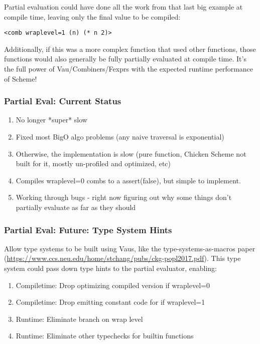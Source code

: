 \documentclass{beamer}
\begin{document}
\begin{frame}[fragile]
Partial evaluation could have done all the work from that last big example at compile time, leaving only the final value to be compiled:
\footnotesize
\begin{verbatim}
<comb wraplevel=1 (n) (* n 2)>
\end{verbatim}
	Additionally, if this was a more complex function that used other functions, those functions would also generally be fully partially evaluated at compile time.
	It's the full power of Vau/Combiners/Fexprs with the expected runtime performance of Scheme!
\end{frame}

\begin{frame}
\frametitle{Partial Eval: Current Status}
  \begin{enumerate}
    \item<1-> No longer *super* slow
    \item<2-> Fixed most BigO algo problems (any naive traversal is exponential)
	\item<3-> Otherwise, the implementation is slow (pure function, Chicken Scheme not built for it, mostly un-profiled and optimized, etc)
	\item<4-> Compiles wraplevel=0 combs to a assert(false), but simple to implement.
	\item<5-> Working through bugs - right now figuring out why some things don't partially evaluate as far as they should
  \end{enumerate}
\end{frame}

\begin{frame}
\frametitle{Partial Eval: Future: Type System Hints}
Allow type systems to be built using Vaus, like the type-systems-as-macros paper (\url{https://www.ccs.neu.edu/home/stchang/pubs/ckg-popl2017.pdf}).
This type system could pass down type hints to the partial evaluator, enabling:
  \begin{enumerate}
    \item<2-> Compiletime: Drop optimizing compiled version if wraplevel=0
	\item<3-> Compiletime: Drop emitting constant code for if wraplevel=1
    \item<4-> Runtime: Eliminate branch on wrap level
    \item<5-> Runtime: Eliminate other typechecks for builtin functions
  \end{enumerate}
\end{frame}
\end{document}
